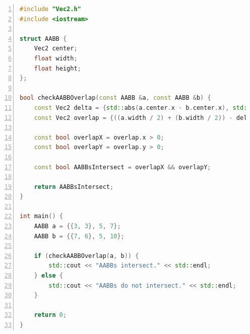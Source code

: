 \begin{mdframed}[linecolor=black!30!white,linewidth=.5pt,extratopheight=1em]
    \begin{lstlisting}[language=C++, aboveskip=3mm,
        belowskip=3mm,
        showstringspaces=false,
        columns=flexible,
        basicstyle={\small\ttfamily},
        numbers=left,
        numberstyle=\tiny\color{gray},
        keywordstyle=\color{blue},
        commentstyle=\color{dkgreen},
        stringstyle=\color{mauve},
        breaklines=true,
        breakatwhitespace=true,
        tabsize=3,
        xleftmargin=1em]
#include "Vec2.h"
#include <iostream>

struct AABB {
    Vec2 center;
    float width;
    float height;
};

bool checkAABBOverlap(const AABB &a, const AABB &b) {
    const Vec2 delta = {std::abs(a.center.x - b.center.x), std::abs(a.center.y - b.center.y)};
    const Vec2 overlap = {((a.width / 2) + (b.width / 2)) - delta.x, ((a.height / 2) + (b.height / 2)) - delta.y};

    const bool overlapX = overlap.x > 0;
    const bool overlapY = overlap.y > 0;

    const bool AABBsIntersect = overlapX && overlapY;

    return AABBsIntersect;
}

int main() {
    AABB a = {{3, 3}, 5, 7};
    AABB b = {{7, 6}, 5, 10};

    if (checkAABBOverlap(a, b)) {
        std::cout << "AABBs intersect." << std::endl;
    } else {
        std::cout << "AABBs do not intersect." << std::endl;
    }

    return 0;
}
\end{lstlisting}
\end{mdframed}

